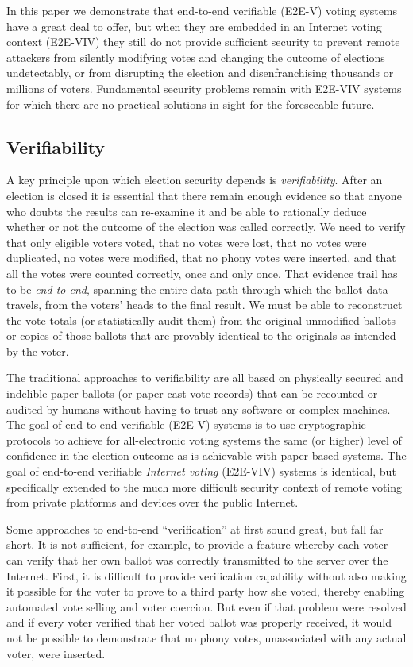 In this paper we demonstrate that end-to-end verifiable (E2E-V) voting
systems have a great deal to offer, but when they are embedded in an
Internet voting context (E2E-VIV) they still do not provide sufficient
security to prevent remote attackers from silently modifying votes and
changing the outcome of elections undetectably, or from disrupting the
election and disenfranchising thousands or millions of
voters. Fundamental security problems remain with E2E-VIV systems for
which there are no practical solutions in sight for the foreseeable
future.

\subsection{Verifiability}

A key principle upon which election security depends is
\emph{verifiability}. After an election is closed it is essential that
there remain enough evidence so that anyone who doubts the results can
re-examine it and be able to rationally deduce whether or not the
outcome of the election was called correctly. We need to verify that
only eligible voters voted, that no votes were lost, that no votes
were duplicated, no votes were modified, that no phony votes were
inserted, and that all the votes were counted correctly, once and only
once. That evidence trail has to be \emph{end to end}, spanning the
entire data path through which the ballot data travels, from the
voters' heads to the final result. We must be able to reconstruct the
vote totals (or statistically audit them) from the original unmodified
ballots or copies of those ballots that are provably identical to the
originals as intended by the voter.

The traditional approaches to verifiability are all based on
physically secured and indelible paper ballots (or paper cast vote
records) that can be recounted or audited by humans without having to
trust any software or complex machines. The goal of end-to-end
verifiable (E2E-V) systems is to use cryptographic protocols to
achieve for all-electronic voting systems the same (or higher) level
of confidence in the election outcome as is achievable with
paper-based systems. The goal of end-to-end verifiable \emph{Internet
  voting} (E2E-VIV) systems is identical, but specifically extended to
the much more difficult security context of remote voting from private
platforms and devices over the public Internet.

Some approaches to end-to-end ``verification'' at first sound great,
but fall far short. It is not sufficient, for example, to provide a
feature whereby each voter can verify that her own ballot was
correctly transmitted to the server over the Internet. First, it is
difficult to provide verification capability without also making it
possible for the voter to prove to a third party how she voted,
thereby enabling automated vote selling and voter coercion. But even
if that problem were resolved and if every voter verified that her
voted ballot was properly received, it would not be possible to
demonstrate that no phony votes, unassociated with any actual voter,
were inserted.

